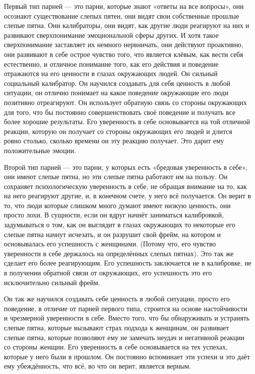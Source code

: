 Первый тип парней --- это парни, которые знают «ответы на все вопросы», они осознают существование слепых пятен, они видят свои собственные прошлые слепые пятна. Они калибраторы, они видят, как другие люди реагируют на них и развивают сверхпонимание эмоциональной сферы других. И хотя такое сверхпонимание заставляет их немного нервничать, они действуют проактивно, они развивают в себе острое чувство того, что является клёвым, как вести себя естественно, и отличное понимание того, как его действия и поведение отражаются на его ценности в глазах окружающих людей. Он сильный социальный калибратор. Он научился создавать для себя ценность в любой ситуации, он отлично понимает на какое поведение окружающие его люди позитивно отреагируют. Он использует обратную связь со стороны окружающих для того, что бы постоянно совершенствовать своё поведение и получать все более хорошие результаты. Его уверенность в себе основывается на той отличной реакции, которую он получает со стороны окружающих его людей и длится ровно столько, сколько времени он эту реакцию получает. Это дарит ему положительные эмоции.

Второй тип парней --- это парни, у которых есть «бредовая уверенность в себе», они имеют слепые пятна, но эти слепые пятна работают им на пользу. Он сохраняет психологическую уверенность в себе, не обращая внимание на то, как на него реагируют другие, и, в конечном счете, у него всё получается. Он верит в то, что люди которые слишком много думают имеют низкую ценность, они просто лохи. В сущности, если он вдруг начнёт заниматься калибровкой, задумываться о том, как он выглядит в глазах окружающих то некоторые его слепые пятна начнут исчезать, и он разрушит свой фрейм, на котором и основывалась его успешность с женщинами. (Потому что, его чувство уверенности в себе держалось на определённых слепых пятнах). Это так же сделает его более реагирующим. Его успешность заключается не в калибровке, не в получении обратной связи от окружающих, его успешность это его исключительно сильный фрейм.

Он так же научился создавать себе ценность в любой ситуации, просто его поведение, в отличие от парней первого типа, строится на основе настойчивости и чрезмерной уверенности в себе. Вместо того, что бы обнаруживать и устранять слепые пятна, которые вызывают страх подхода к женщинам, он развивает слепые пятна, которые позволяют ему не замечать неудач и негативной реакции со стороны женщин. Его уверенность в себе основывается на тех успехах, которые у него были в прошлом. Он постоянно вспоминает эти успехи и это даёт ему убеждённость, что всё, во что он верит, является верным.

